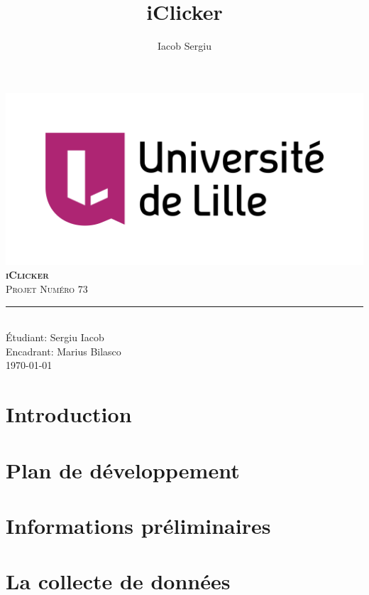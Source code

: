 \documentclass[11pt,titlepage]{report}
\author{Iacob Sergiu}
\title{iClicker}
\begin{document}
\begin{titlepage}
    \centering
    \includegraphics[width=0.75\linewidth]{universite_de_lille.png}\\[0.25cm]
    \vspace{\fill}
    \textbf{\textsc{\fontsize{50}{50}\selectfont iClicker}}\\ \vspace{\fill}		
	\textsc{\LARGE Projet Numéro 73}\\[0.4cm]
    \rule{\linewidth}{0.2 mm}\\[0.5 cm]
    Étudiant: Sergiu Iacob
    \\
    Encadrant: Marius Bilasco
    \\
    \vspace{\fill}
    \monthyeardate\today
\end{titlepage}
\restoregeometry

{\pagestyle{plain}
\tableofcontents
\cleardoublepage}

\chapter{Introduction}


\chapter{Plan de développement}


\chapter{Informations préliminaires}


\chapter{La collecte de données}

\end{document}
